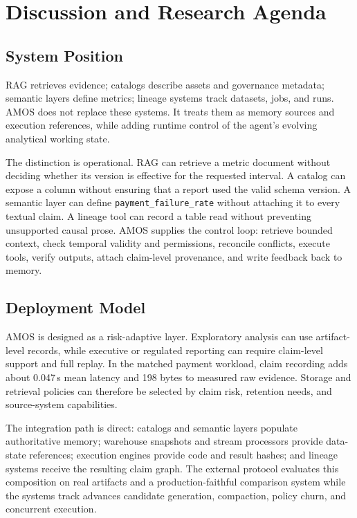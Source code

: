 \documentclass[sigconf,nonacm]{acmart}
\newcommand{\amos}{\textsc{AMOS}\xspace}
\newcommand{\code}[1]{\texttt{#1}}
\begin{document}
\section{Discussion and Research Agenda}

\subsection{System Position}
RAG retrieves evidence; catalogs describe assets and governance metadata; semantic layers define metrics; lineage systems track datasets, jobs, and runs. \amos does not replace these systems. It treats them as memory sources and execution references, while adding runtime control of the agent's evolving analytical working state.

The distinction is operational. RAG can retrieve a metric document without deciding whether its version is effective for the requested interval. A catalog can expose a column without ensuring that a report used the valid schema version. A semantic layer can define \code{payment\_failure\_rate} without attaching it to every textual claim. A lineage tool can record a table read without preventing unsupported causal prose. \amos supplies the control loop: retrieve bounded context, check temporal validity and permissions, reconcile conflicts, execute tools, verify outputs, attach claim-level provenance, and write feedback back to memory.

\subsection{Deployment Model}
\amos is designed as a risk-adaptive layer. Exploratory analysis can use artifact-level records, while executive or regulated reporting can require claim-level support and full replay. In the matched payment workload, claim recording adds about 0.047\,s mean latency and 198 bytes to measured raw evidence. Storage and retrieval policies can therefore be selected by claim risk, retention needs, and source-system capabilities.

The integration path is direct: catalogs and semantic layers populate authoritative memory; warehouse snapshots and stream processors provide data-state references; execution engines provide code and result hashes; and lineage systems receive the resulting claim graph. The external protocol evaluates this composition on real artifacts and a production-faithful comparison system while the systems track advances candidate generation, compaction, policy churn, and concurrent execution.
\end{document}
